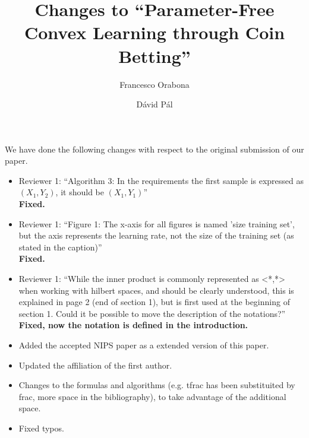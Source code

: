 \documentclass{article}
\author{Francesco Orabona
\and
D\'avid P\'al}
\title{Changes to ``Parameter-Free Convex Learning through Coin Betting''}
\begin{document}
\maketitle

We have done the following changes with respect to the original submission of our paper.
\begin{itemize}
\item Reviewer 1: ``Algorithm 3: In the requirements the first sample is expressed as $(X_{1}, Y_{2})$, it should be $(X_{1}, Y_{1})$''\\
\textbf{Fixed.}
\item Reviewer 1: ``Figure 1: The x-axis for all figures is named 'size training set', but the axis represents the learning rate, not the size of the training set (as stated in the caption)''\\
\textbf{Fixed.}
\item Reviewer 1: ``While the inner product is commonly represented as <*,*> when working with hilbert spaces, and should be clearly understood, this is explained in page 2 (end of section 1), but is first used at the beginning of section 1. Could it be possible to move the description of the notations?''\\
\textbf{Fixed, now the notation is defined in the introduction.}
\item Added the accepted NIPS paper as a extended version of this paper.
\item Updated the affiliation of the first author.
\item Changes to the formulas and algorithms (e.g. tfrac has been substituited by frac, more space in the bibliography), to take advantage of the additional space.
\item Fixed typos.
\end{itemize}
\end{document}
